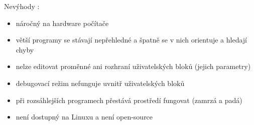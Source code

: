 Nevýhody \legoSW:
\renewcommand{\labelitemi}{$-$}
\begin{itemize}[noitemsep]\itemsep2pt
	\item náročný na hardware počítače
	\item větší programy se stávají nepřehledné a špatně se v nich orientuje a hledají chyby
	\item nelze editovat proměnné ani rozhraní uživatelských bloků (jejich parametry)
	\item debugovací režim nefunguje uvnitř uživatelských bloků
	\item při rozsáhlejších programech přestává prostředí fungovat (zamrzá a padá)
	\item není dostupný na Linuxu a není open-source
\end{itemize}

